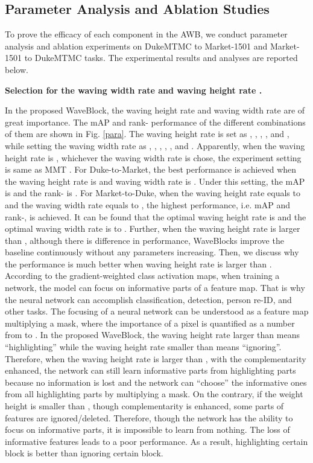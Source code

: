 \documentclass[journal]{IEEEtran}
\begin{document}
\subsection{Parameter Analysis and Ablation Studies}
To prove the efficacy of each component in the AWB, we conduct parameter analysis and ablation experiments on DukeMTMC to Market-1501 and Market-1501 to DukeMTMC tasks. The experimental results and analyses are reported below.\par 
\textbf{Selection for the waving width rate  and waving height rate .}\par 
In the proposed WaveBlock, the waving height rate and waving width rate are of great importance. The mAP and rank- performance of the different combinations of them are shown in Fig. \ref{para}. The waving height rate is set as , , , , and , while setting the waving width rate as , , , , , and . Apparently, when the waving height rate is , whichever the waving width rate is chose, the experiment setting is same as MMT \cite{ge2020mutual}. For Duke-to-Market, the best performance is achieved when the waving height rate is  and waving width rate is . Under this setting, the mAP is  and the rank- is . For Market-to-Duke, when the waving height rate equals to  and the waving width rate equals to , the highest performance, i.e.  mAP and  rank-, is achieved. It can be found that the optimal waving height rate is  and the optimal waving width rate is  to . Further, when the waving height rate is larger than , although there is difference in performance, WaveBlocks improve the baseline continuously without any parameters increasing. Then, we discuss why the performance is much better when waving height rate is larger than . According to the gradient-weighted class activation maps, when training a network, the model can focus on informative parts of a feature map. That is why the neural network can accomplish classification, detection, person re-ID, and other tasks. The focusing of a neural network can be understood as a feature map multiplying a mask, where the importance of a pixel is quantified as a number from  to . In the proposed WaveBlock, the waving height rate larger than  means ``highlighting'' while the waving height rate smaller than  means ``ignoring''. Therefore, when the waving height rate is larger than , with the complementarity enhanced, the network can still learn informative parts from highlighting parts because no information is lost and the network can ``choose'' the informative ones from all highlighting parts by multiplying a  mask. On the contrary, if the weight height is smaller than , though complementarity is enhanced, some parts of features are ignored/deleted. Therefore, though the network has the ability to focus on informative parts, it is impossible to learn from nothing.  The loss of informative features leads to a poor performance. As a result, highlighting certain block is better than ignoring certain block.
\end{document}
